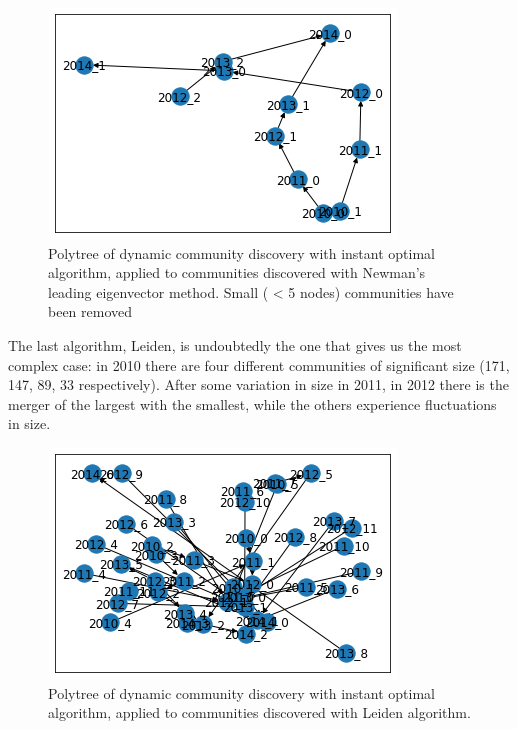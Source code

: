\documentclass[sigchi]{acmart}
\begin{document}
\begin{figure}[H]
	\centering
	\includegraphics[width=\linewidth]{polyt eig removed.png}
	\caption{Polytree of dynamic community discovery with instant optimal algorithm, applied to communities discovered with Newman’s leading eigenvector method. Small ( < 5 nodes) communities have been removed}
\end{figure}

The last algorithm, Leiden, is undoubtedly the one that gives us the most complex case: in 2010 there are four different communities of significant size (171, 147, 89, 33 respectively). After some variation in size in 2011, in 2012 there is the merger of the largest with the smallest, while the others experience fluctuations in size.

\begin{figure}[H]
	\centering
	\includegraphics[width=\linewidth]{polyt lei full.png}
	\caption{Polytree of dynamic community discovery with instant optimal algorithm, applied to communities discovered with Leiden algorithm.}
\end{figure}
\end{document}
